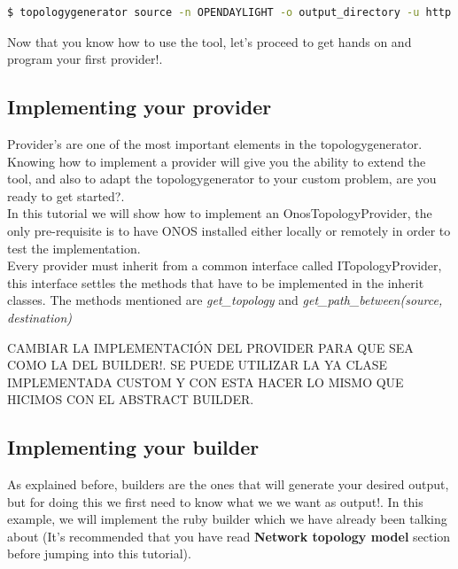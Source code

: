 \begin{lstlisting}[language=bash,breaklines=true]
$ topologygenerator source -n OPENDAYLIGHT -o output_directory -u http://localhost:8080/restconf/operational/network-topology:network-topology/topology/flow:1/ -d builders_examples/ruby_builders
\end{lstlisting}

Now that you know how to use the tool, let's proceed to get hands on and program your first provider!.

\subsection{Implementing your provider}

Provider's are one of the most important elements in the topologygenerator. Knowing how to implement a provider will give you the ability to extend the tool, and also to adapt the topologygenerator to your custom problem, are you ready to get started?. \\

In this tutorial we will show how to implement an OnosTopologyProvider, the only pre-requisite is to have ONOS installed either locally or remotely in order to test the implementation. \\

Every provider must inherit from a common interface called ITopologyProvider, this interface settles the methods that have to be implemented in the inherit classes. The methods mentioned are \textit{get\_topology} and \textit{get\_path\_between(source, destination)}


CAMBIAR LA IMPLEMENTACIÓN DEL PROVIDER PARA QUE SEA COMO LA DEL BUILDER!. SE PUEDE UTILIZAR LA YA CLASE IMPLEMENTADA CUSTOM Y CON ESTA HACER LO MISMO QUE HICIMOS CON EL ABSTRACT BUILDER.

\subsection{Implementing your builder}

As explained before, builders are the ones that will generate your desired output, but for doing this we first need to know what we we want as output!. In this example, we will implement the ruby builder which we have already been talking about (It's recommended that you have read \textbf{Network topology model} section before jumping into this tutorial). \\

